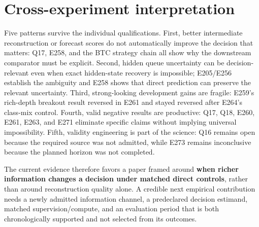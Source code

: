 \documentclass[10pt,a4paper]{article}
\begin{document}
\section{Cross-experiment interpretation}
Five patterns survive the individual qualifications. First, better intermediate reconstruction or forecast scores do not automatically improve the decision that matters: Q17, E258, and the BTC strategy chain all show why the downstream comparator must be explicit. Second, hidden queue uncertainty can be decision-relevant even when exact hidden-state recovery is impossible; E205/E256 establish the ambiguity and E258 shows that direct prediction can preserve the relevant uncertainty. Third, strong-looking development gains are fragile: E259's rich-depth breakout result reversed in E261 and stayed reversed after E264's class-mix control. Fourth, valid negative results are productive: Q17, Q18, E260, E261, E263, and E271 eliminate specific claims without implying universal impossibility. Fifth, validity engineering is part of the science: Q16 remains open because the required source was not admitted, while E273 remains inconclusive because the planned horizon was not completed.\par
The current evidence therefore favors a paper framed around \textbf{when richer information changes a decision under matched direct controls}, rather than around reconstruction quality alone. A credible next empirical contribution needs a newly admitted information channel, a predeclared decision estimand, matched supervision/compute, and an evaluation period that is both chronologically supported and not selected from its outcomes.\par
\end{document}

